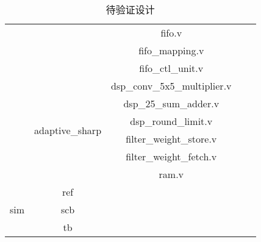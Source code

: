 \begin{table}[htb]
\begin{tabular}{|c|c|c|ll}
                          &                                       & fifo.v                              &  &  \\ \cline{3-3}
                          &                                       & fifo\_mapping.v                     &  &  \\ \cline{3-3}
                          &                                       & fifo\_ctl\_unit.v                   &  &  \\ \cline{2-3}
                          & \multirow{6}{*}{adaptive\_sharp}      & dsp\_conv\_5x5\_multiplier.v        &  &  \\ \cline{3-3}
                          &                                       & dsp\_25\_sum\_adder.v               &  &  \\ \cline{3-3}
                          &                                       & dsp\_round\_limit.v                 &  &  \\ \cline{3-3}
                          &                                       & filter\_weight\_store.v             &  &  \\ \cline{3-3}
                          &                                       & filter\_weight\_fetch.v             &  &  \\ \cline{3-3}
                          &                                       & ram.v                               &  &  \\ \cline{1-3}
    \multirow{3}{*}{sim}  & ref                                   &                                     &  &  \\ \cline{2-3}
                          & scb                                   &                                     &  &  \\ \cline{2-3}
                          & tb                                    &                                     &  &  \\ \cline{1-3}
    \end{tabular}
	\caption{待验证设计}
    \end{table}